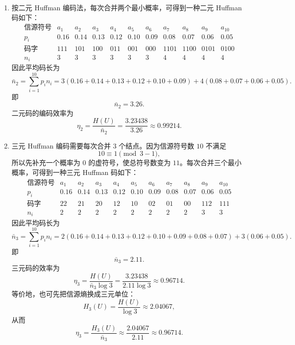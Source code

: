 \documentclass[UTF8,11pt,a4paper]{ctexart}
\begin{document}
\begin{enumerate}[label=\textnormal{(\alph*)}]
  \item 按二元 Huffman 编码法，每次合并两个最小概率，可得到一种二元 Huffman 码如下：
  \[
  \begin{array}{c|cccccccccc}
  \text{信源符号} & a_1 & a_2 & a_3 & a_4 & a_5 & a_6 & a_7 & a_8 & a_9 & a_{10}\\ \hline
  p_i & 0.16 & 0.14 & 0.13 & 0.12 & 0.10 & 0.09 & 0.08 & 0.07 & 0.06 & 0.05\\
  \text{码字} & 111 & 101 & 100 & 011 & 001 & 000 & 1101 & 1100 & 0101 & 0100\\
  n_i & 3 & 3 & 3 & 3 & 3 & 3 & 4 & 4 & 4 & 4
  \end{array}
  \]
  因此平均码长为
  \[
  \bar n_2=\sum_{i=1}^{10}p_in_i
  =3(0.16+0.14+0.13+0.12+0.10+0.09)
  +4(0.08+0.07+0.06+0.05).
  \]
  即
  \[
  \bar n_2=3.26.
  \]
  二元码的编码效率为
  \[
  \eta_2=\frac{H(U)}{\bar n_2}
  =\frac{3.23438}{3.26}
  \approx 0.99214.
  \]

  \item 三元 Huffman 编码需要每次合并 $3$ 个结点。因为信源符号数 $10$ 不满足
  \[
  10\equiv 1 \pmod{3-1},
  \]
  所以先补充一个概率为 $0$ 的虚符号，使总符号数变为 $11$。每次合并三个最小概率，可得到一种三元 Huffman 码如下：
  \[
  \begin{array}{c|cccccccccc}
  \text{信源符号} & a_1 & a_2 & a_3 & a_4 & a_5 & a_6 & a_7 & a_8 & a_9 & a_{10}\\ \hline
  p_i & 0.16 & 0.14 & 0.13 & 0.12 & 0.10 & 0.09 & 0.08 & 0.07 & 0.06 & 0.05\\
  \text{码字} & 22 & 21 & 20 & 12 & 10 & 02 & 01 & 00 & 112 & 111\\
  n_i & 2 & 2 & 2 & 2 & 2 & 2 & 2 & 2 & 3 & 3
  \end{array}
  \]
  因此平均码长为
  \[
  \bar n_3=\sum_{i=1}^{10}p_in_i
  =2(0.16+0.14+0.13+0.12+0.10+0.09+0.08+0.07)
  +3(0.06+0.05).
  \]
  即
  \[
  \bar n_3=2.11.
  \]
  三元码的效率为
  \[
  \eta_3=\frac{H(U)}{\bar n_3\log 3}
  =\frac{3.23438}{2.11\log 3}
  \approx 0.96714.
  \]
  等价地，也可先把信源熵换成三元单位：
  \[
  H_3(U)=\frac{H(U)}{\log 3}\approx 2.04067,
  \]
  从而
  \[
  \eta_3=\frac{H_3(U)}{\bar n_3}\approx \frac{2.04067}{2.11}\approx 0.96714.
  \]
\end{enumerate}

\vspace{0.8em}
\end{document}
